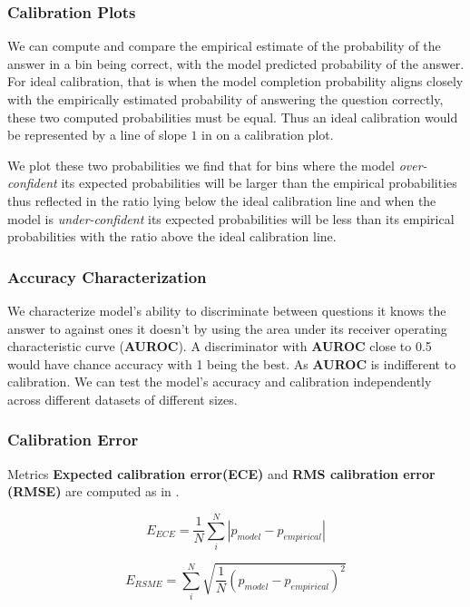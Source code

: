 \documentclass[11pt]{article}
\begin{document}
\subsubsection{Calibration Plots}

We can compute and compare the  empirical estimate of the 
probability of the answer in a bin being correct, with the model 
predicted probability of the answer. For ideal calibration, that 
is when the model completion probability aligns closely with the 
empirically estimated probability of answering the question correctly, 
these  two computed probabilities must be equal. 
Thus an ideal calibration would be represented by a line of 
slope $1$ in on a calibration plot.

We plot these two probabilities we find that for bins 
where the model \emph{over-confident} its expected 
probabilities will be larger than the empirical probabilities 
thus reflected in the ratio lying below the ideal calibration 
line and when the model is \emph{under-confident} its 
expected probabilities will be less than its empirical  
probabilities with the ratio above the 
ideal calibration line.

\subsubsection{Accuracy Characterization}

We characterize model's ability to discriminate between questions it 
knows the answer to against ones it doesn't  by using the area under 
its receiver operating characteristic curve (\textbf{AUROC}). 
A discriminator with \textbf{AUROC}  close to 0.5 would have 
chance accuracy with 1 being the best. As \textbf{AUROC} is 
indifferent to calibration. We can test the model's accuracy 
and calibration independently across different datasets of 
different sizes.

\subsubsection{Calibration Error}

Metrics \textbf{Expected calibration error(ECE)} and \textbf{RMS calibration error (RMSE)} are computed as in \cite{kadavath2022language}. 

\begin{equation}
    E_{ECE} = \frac{1}{N}  \sum_{i}^N | p_{model} - p_{empirical}|
\end{equation}

\begin{equation}
    E_{RSME} = \sum_{i}^N \sqrt{\frac{1}{N} (p_{model} - p_{empirical})^2}
\end{equation}
\end{document}
